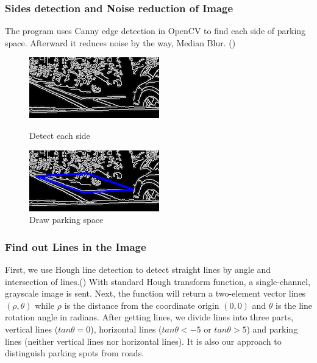 \documentclass[runningheads,a4paper]{llncs}
\begin{document}
\subsubsection{Sides detection and Noise reduction of Image}

The program uses Canny edge detection in OpenCV to find each side of
parking space. Afterward it reduces noise by the way, Median Blur.
()

\begin{figure}[tbp]
	\begin{minipage}{.4\textwidth}
		\centering
		\includegraphics[scale=0.7,natwidth=444,natheight=236]{Figures/sideDetecting.png}
		\caption{Detect each side}
		\label{sideDetecting}
	\end{minipage}
	\hspace{0.5in}
	\begin{minipage}{.4\textwidth}
		\centering
		\includegraphics[scale=0.7,natwidth=444,natheight=237]{Figures/drawParkingSpace.png}
		\caption{Draw parking space}
		\label{drawParkingSpace}
	\end{minipage}
\end{figure}

\subsubsection{Find out Lines in the Image}

First, we use Hough line detection to detect straight lines
by angle and intersection of lines.()
With standard Hough transform function, a single-channel, grayscale image is sent.
Next, the function will return a two-element vector lines $(\rho, \theta)$ while $\rho$ is the distance
from the coordinate origin $(0, 0)$ and $\theta$ is the line rotation angle in radians.
After getting lines, we divide lines into three parts, vertical lines ($tan\theta = 0$),
horizontal lines ($tan\theta < -5$ or $tan\theta > 5$) and parking lines
(neither vertical lines nor horizontal lines). It is also our approach to
distinguish parking spots from roads.
\end{document}
